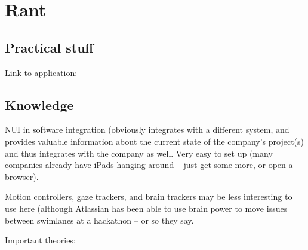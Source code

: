 \section{Rant}

\subsection{Practical stuff}

Link to application: %

\subsection{Knowledge}

NUI in software integration (obviously integrates with a different system, and provides valuable information about the current state of the company's project(s) and thus integrates with the company as well. Very easy to set up (many companies already have iPads hanging around – just get some more, or open a browser).

Motion controllers, gaze trackers, and brain trackers may be less interesting to use here (although Atlassian has been able to use brain power to move issues between swimlanes at a hackathon – or so they say.



Important theories:

